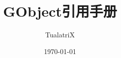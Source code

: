 \documentclass[a4paper]{book}
\begin{document}
\begin{CJK}{UTF8}{song}
\title{GObject引用手册}
\author{TualatriX}
\date{\today}

\maketitle
\tableofcontents
\newpage






\newpage
\end{CJK}
\end{document}

